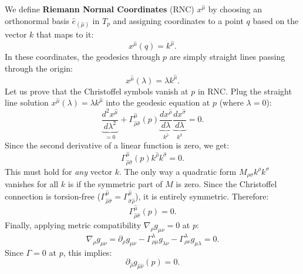 \documentclass[11pt, a4paper]{report}
\begin{document}

We define \textbf{Riemann Normal Coordinates} (RNC) \(x^{\hat{\mu}}\) by choosing an orthonormal basis \(\hat{e}_{(\hat{\mu})}\) in \(T_p\) and assigning coordinates to a point \(q\) based on the vector \(k\) that maps to it:
\begin{equation}
x^{\hat{\mu}}(q) = k^{\hat{\mu}}.
\end{equation}
In these coordinates, the geodesics through \(p\) are simply straight lines passing through the origin:
\begin{equation}
x^{\hat{\mu}}(\lambda) = \lambda k^{\hat{\mu}}.
\end{equation}
Let us prove that the Christoffel symbols vanish at \(p\) in RNC.
Plug the straight line solution \(x^{\hat{\mu}}(\lambda) = \lambda k^{\hat{\mu}}\) into the geodesic equation at \(p\) (where \(\lambda=0\)):
\begin{equation}
\underbrace{\frac{d^2 x^{\hat{\mu}}}{d\lambda^2}}_{=0} + \Gamma^{\hat{\mu}}_{\hat{\rho}\hat{\sigma}}(p) \underbrace{\frac{dx^{\hat{\rho}}}{d\lambda}}_{k^{\hat{\rho}}} \underbrace{\frac{dx^{\hat{\sigma}}}{d\lambda}}_{k^{\hat{\sigma}}} = 0.
\end{equation}
Since the second derivative of a linear function is zero, we get:
\begin{equation}
\Gamma^{\hat{\mu}}_{\hat{\rho}\hat{\sigma}}(p) k^{\hat{\rho}} k^{\hat{\sigma}} = 0.
\end{equation}
This must hold for \emph{any} vector \(k\). The only way a quadratic form \(M_{\rho\sigma} k^\rho k^\sigma\) vanishes for all \(k\) is if the symmetric part of \(M\) is zero. Since the Christoffel connection is torsion-free (\(\Gamma^{\hat{\mu}}_{\hat{\rho}\hat{\sigma}} = \Gamma^{\hat{\mu}}_{\hat{\sigma}\hat{\rho}}\)), it is entirely symmetric. Therefore:
\begin{equation}
\Gamma^{\hat{\mu}}_{\hat{\rho}\hat{\sigma}}(p) = 0.
\end{equation}
Finally, applying metric compatibility \(\nabla_\rho g_{\mu\nu} = 0\) at \(p\):
\begin{equation}
\nabla_\rho g_{\mu\nu} = \partial_\rho g_{\mu\nu} - \Gamma^\lambda_{\rho\mu} g_{\lambda\nu} - \Gamma^\lambda_{\rho\nu} g_{\mu\lambda} = 0.
\end{equation}
Since \(\Gamma=0\) at \(p\), this implies:
\begin{equation}
\partial_{\hat{\rho}} g_{\hat{\mu}\hat{\nu}}(p) = 0.
\end{equation}
\end{document}
